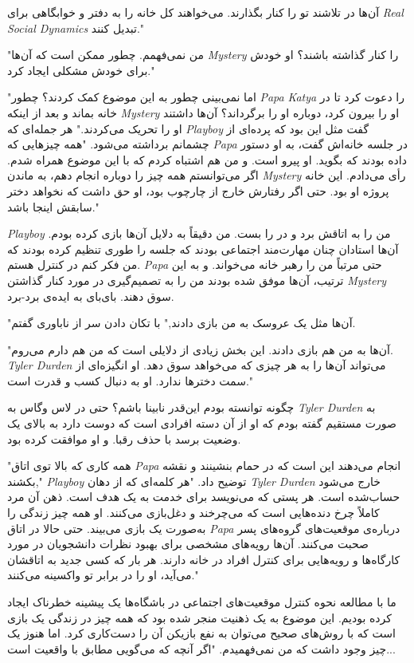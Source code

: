\RTL
آن‌ها در تلاشند تو را کنار بگذارند. می‌خواهند کل خانه را به دفتر و خوابگاهی برای \textit{Real Social Dynamics} تبدیل کنند."

"من نمی‌فهمم. چطور ممکن است که آن‌ها \textit{Mystery} را کنار گذاشته باشند؟ او خودش برای خودش مشکلی ایجاد کرد."

"اما نمی‌بینی چطور به این موضوع کمک کردند؟ چطور \textit{Papa} \textit{Katya} را دعوت کرد تا در خانه بماند و بعد از اینکه \textit{Mystery} او را بیرون کرد، دوباره او را برگرداند؟ آن‌ها داشتند او را تحریک می‌کردند." هر جمله‌ای که \textit{Playboy} گفت مثل این بود که پرده‌ای از چشمانم برداشته می‌شود. "همه چیزهایی که \textit{Papa} در جلسه خانه‌اش گفت، به او دستور داده بودند که بگوید. او پیرو است. و من هم اشتباه کردم که با این موضوع همراه شدم. اگر می‌توانستم همه چیز را دوباره انجام دهم، به ماندن \textit{Mystery} رأی می‌دادم. این خانه پروژه او بود. حتی اگر رفتارش خارج از چارچوب بود، او حق داشت که نخواهد دختر سابقش اینجا باشد."

\textit{Playboy} من را به اتاقش برد و در را بست. من دقیقاً به دلایل آن‌ها بازی کرده بودم. آن‌ها استادان چنان مهارت‌مند اجتماعی بودند که جلسه را طوری تنظیم کرده بودند که من فکر کنم در کنترل هستم. \textit{Papa} حتی مرتباً من را رهبر خانه می‌خواند. و به این ترتیب، آن‌ها موفق شده بودند من را به تصمیم‌گیری در مورد کنار گذاشتن \textit{Mystery} سوق دهند. بای‌بای به ایده‌ی برد-برد.

"آن‌ها مثل یک عروسک به من بازی دادند," با تکان دادن سر از ناباوری گفتم.

"آن‌ها به من هم بازی دادند. این بخش زیادی از دلایلی است که من هم دارم می‌روم. \textit{Tyler Durden} می‌تواند آن‌ها را به هر چیزی که می‌خواهد سوق دهد. او انگیزه‌ای از سمت دخترها ندارد. او به دنبال کسب و قدرت است."

چگونه توانسته بودم این‌قدر نابینا باشم؟ حتی در لاس وگاس به \textit{Tyler Durden} به صورت مستقیم گفته بودم که او از آن دسته افرادی است که دوست دارد به بالای یک وضعیت برسد با حذف رقبا. و او موافقت کرده بود.

"همه کاری که بالا توی اتاق \textit{Papa} انجام می‌دهند این است که در حمام بنشینند و نقشه بکشند," \textit{Playboy} توضیح داد. "هر کلمه‌ای که از دهان \textit{Tyler Durden} خارج می‌شود حساب‌شده است. هر پستی که می‌نویسد برای خدمت به یک هدف است. ذهن آن مرد کاملاً چرخ دنده‌هایی است که می‌چرخند و دغل‌بازی می‌کنند. او همه چیز زندگی را به‌صورت یک بازی می‌بیند. حتی حالا در اتاق \textit{Papa} درباره‌ی موقعیت‌های گروه‌های پسر صحبت می‌کنند. آن‌ها رویه‌های مشخصی برای بهبود نظرات دانشجویان در مورد کارگاه‌ها و رویه‌هایی برای کنترل افراد در خانه دارند. هر بار که کسی جدید به اتاقشان می‌آید، او را در برابر تو واکسینه می‌کنند."

ما با مطالعه نحوه کنترل موقعیت‌های اجتماعی در باشگاه‌ها یک پیشینه خطرناک ایجاد کرده بودیم. این موضوع به یک ذهنیت منجر شده بود که همه چیز در زندگی یک بازی است که با روش‌های صحیح می‌توان به نفع بازیکن آن را دست‌کاری کرد. اما هنوز یک چیز وجود داشت که من نمی‌فهمیدم. "اگر آنچه که می‌گویی مطابق با واقعیت است...